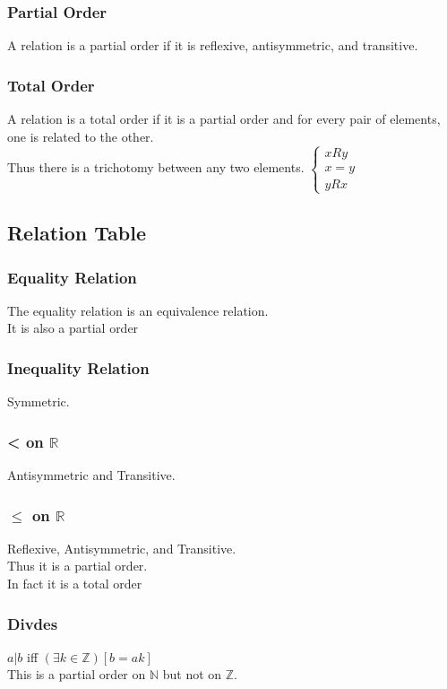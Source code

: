 \documentclass{article}
\begin{document}
\subsubsection*{Partial Order}
A relation is a partial order if it is reflexive, antisymmetric, and transitive.
\subsubsection*{Total Order}
A relation is a total order if it is a partial order and for every pair of elements, one is related to the other.\\
Thus there is a trichotomy between any two elements.
$\begin{cases}
    xRy\\
    x = y\\
    yRx
\end{cases}$
\subsection*{Relation Table}
\subsubsection*{Equality Relation}
The equality relation is an equivalence relation.\\
It is also a partial order 
\subsubsection*{Inequality Relation}
Symmetric. 
\subsubsection*{< on $\mathbb{R}$}
Antisymmetric and Transitive.
\subsubsection*{$\leq$ on $\mathbb{R}$}
Reflexive, Antisymmetric, and Transitive.\\
Thus it is a partial order.\\
In fact it is a total order
\subsubsection*{Divdes}
$a|b$ iff $(\exists k \in \mathbb{Z})[b = ak]$\\
This is a partial order on $\mathbb{N}$ but not on $\mathbb{Z}$.
\end{document}
